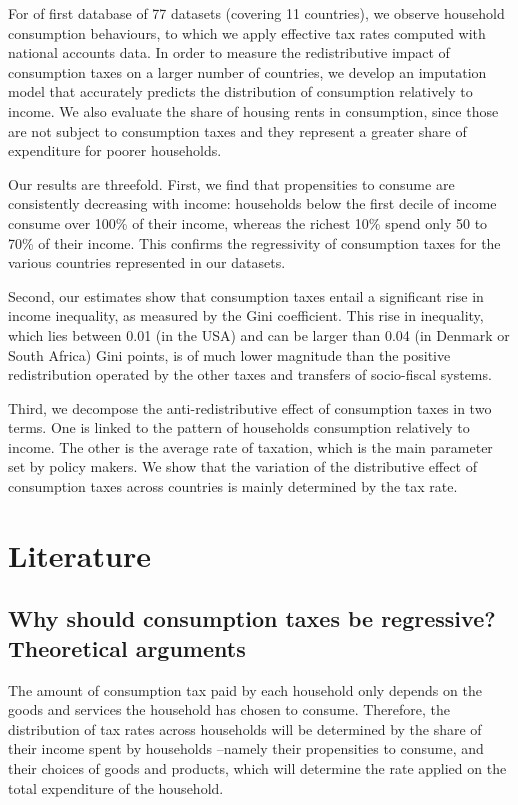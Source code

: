 \documentclass[12pt]{article}
\begin{document}
For of first database of 77 datasets (covering 11 countries), we observe household consumption behaviours, to which we apply effective tax rates computed with national accounts data. In order to measure the redistributive impact of consumption taxes on a larger number of countries,  we develop an imputation model that accurately predicts the distribution of consumption relatively to income. We also evaluate the share of housing rents in consumption, since those are not subject to consumption taxes and they represent a greater share of expenditure for poorer households.

Our results are threefold. First, we find that propensities to consume are consistently decreasing with income: households below the first decile of income consume over 100\% of their income, whereas the richest 10\% spend only 50 to 70\% of their income. This confirms the regressivity of consumption taxes for the various countries represented in our datasets.

Second, our estimates show that consumption taxes entail a significant rise in income inequality, as measured by the Gini coefficient. This rise in inequality, which lies between 0.01 (in the USA) and can be larger than 0.04 (in Denmark or South Africa) Gini points, is of much lower magnitude than the positive redistribution operated by the other taxes and transfers of socio-fiscal systems.

Third, we decompose the anti-redistributive effect of consumption taxes in two terms. One is linked to the pattern of households consumption relatively to income. The other is the average rate of taxation, which is the main parameter set by policy makers. We show that the variation of the distributive effect of consumption taxes across countries is mainly determined by the tax rate.


\section{Literature}

\subsection{Why should consumption taxes be regressive? Theoretical arguments}

\label{sub:sources}

The amount of consumption tax paid by each household  only depends on the goods and services the household has chosen to consume. Therefore, the distribution of tax rates across households will be determined by the share of their income spent by households --namely their propensities to consume, and their choices of goods and products, which will determine the rate applied on the total expenditure of the household.
\end{document}
